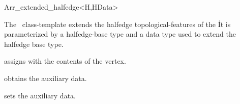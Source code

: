 
\ccRefPageBegin

\begin{ccRefClass}{Arr_extended_halfedge<H,HData>}

\ccDefinition
  The \ccRefName\ class-template extends the halfedge topological-features of
  the \dcel\. It is parameterized by a halfedge-base type  and a data
  type  used to extend the halfedge base type.


\ccIsModel

\ccInheritsFrom

\ccCreation
  {assigns \ccVar{} with the contents of the  vertex.}

\ccAccessFunctions
  {obtains the auxiliary data.}

\ccModifiers
  {sets the auxiliary data.}

\ccSeeAlso

\end{ccRefClass}

\ccRefPageEnd
